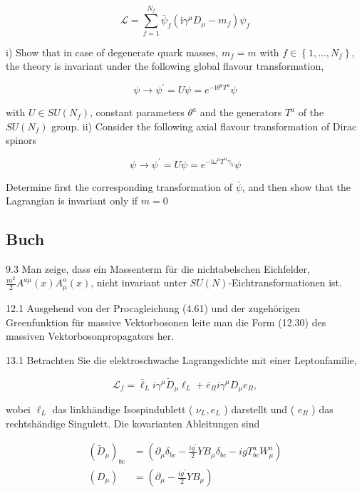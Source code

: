\documentclass[10pt, letterpaper]{article}
\begin{document}
$$
\mathcal{L}=\sum_{f=1}^{N_f} \bar{\psi}_f\left(\mathrm{i} \gamma^\mu D_\mu-m_f\right) \psi_f
$$

i) Show that in case of degenerate quark masses, $m_f=m$ with $f \in\left\{1, \ldots, N_f\right\}$, the theory is invariant under the following global flavour transformation,

$$
\psi \rightarrow \psi^{\prime}=U \psi=e^{-\mathrm{i} \theta^a T^a} \psi
$$

with $U \in S U\left(N_f\right)$, constant parameters $\theta^a$ and the generators $T^a$ of the $S U\left(N_f\right)$ group.
ii) Consider the following axial flavour transformation of Dirac spinors

$$
\psi \rightarrow \psi^{\prime}=U \psi=e^{-\mathrm{i} \omega^a T^a \gamma_5} \psi
$$


Determine first the corresponding transformation of $\bar{\psi}$, and then show that the Lagrangian is invariant only if $m=0$



\pagebreak

\subsection{Buch}

9.3 Man zeige, dass ein Massenterm für die nichtabelschen Eichfelder, $\frac{m^2}{2} A^{a \mu}(x) A_\mu^a(x)$, nicht invariant unter $S U(N)$-Eichtransformationen ist.


12.1 Ausgehend von der Procagleichung (4.61) und der zugehörigen Greenfunktion für massive Vektorbosonen leite man die Form (12.30) des massiven Vektorbosonpropagators her.

13.1 Betrachten Sie die elektroschwache Lagrangedichte mit einer Leptonfamilie,

$$
\mathscr{L}_f=\bar{\ell}_L i \gamma^\mu \widetilde{D}_\mu \ell_L+\bar{e}_R i \gamma^\mu D_\mu e_R,
$$

wobei $\ell_L$ das linkhändige Isospindublett ( $\nu_L, e_L$ ) darstellt und ( $e_R$ ) das rechtshändige Singulett. Die kovarianten Ableitungen sind

$$
\begin{aligned}
\left(\widetilde{D}_\mu\right)_{b c} & =\left(\partial_\mu \delta_{b c}-\frac{i g^{\prime}}{2} Y B_\mu \delta_{b c}-i g T_{b c}^a W_\mu^a\right) \\
\left(D_\mu\right) & =\left(\partial_\mu-\frac{i g^{\prime}}{2} Y B_\mu\right)
\end{aligned}
$$
\end{document}
